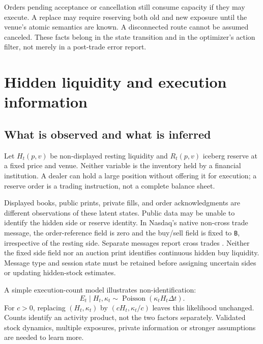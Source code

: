 \documentclass[11pt]{article}
\numberwithin{equation}{section}
\theoremstyle{definition}
\theoremstyle{remark}
\theoremstyle{definition}
\begin{document}
Orders pending acceptance or cancellation still consume capacity if they may
execute. A replace may require reserving both old and new exposure until the
venue's atomic semantics are known. A disconnected route cannot be assumed
canceled. These facts belong in the state transition and in the optimizer's
action filter, not merely in a post-trade error report.

\section{Hidden liquidity and execution information}\label{sec:hidden}

\subsection{What is observed and what is inferred}

Let $H_t(p,v)$ be non-displayed resting liquidity and $R_t(p,v)$ iceberg reserve
at a fixed price and venue. Neither variable is the inventory held by a
financial institution. A dealer can hold a large position without offering
it for execution; a reserve order is a trading instruction, not a complete
balance sheet.

Displayed books, public prints, private fills, and order acknowledgments are
different observations of these latent states. Public data may be unable to
identify the hidden side or reserve identity. In Nasdaq's native non-cross trade
message, the order-reference field is zero and the buy/sell field is fixed to
\texttt{B}, irrespective of the resting side. Separate messages report cross
trades \citep{itch}. Neither the fixed side field nor an auction print identifies
continuous hidden buy liquidity. Message type and session state must be retained
before assigning uncertain sides or updating hidden-stock estimates.

A simple execution-count model illustrates non-identification:
\begin{equation}\label{eq:hiddenproduct}
 E_t\mid H_t,\kappa_t\sim\operatorname{Poisson}(\kappa_tH_t\Delta t).
\end{equation}
For $c>0$, replacing $(H_t,\kappa_t)$ by $(cH_t,\kappa_t/c)$ leaves this
likelihood unchanged. Counts identify an activity product, not the two factors
separately. Validated stock dynamics, multiple exposures, private information
or stronger assumptions are needed to learn more.
\end{document}
